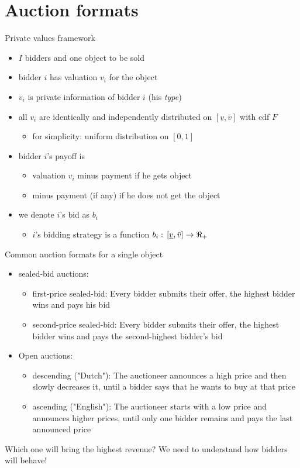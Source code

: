 \documentclass[bigger]{beamer}
\begin{document}
\section{Auction formats}
\label{sec:org2b4d17e}
\begin{frame}[label={sec:orge7ff8d6}]{Private values framework}
\begin{itemize}
\item \(I\) bidders and one object to be sold
\item bidder \(i\) has valuation \(v_i\) for the object
\item \(v_i\) is private information of bidder \(i\) (his \emph{type})
\item all \(v_i\) are identically and independently distributed on \([\underline v,\bar v]\) with cdf \(F\)
\begin{itemize}
\item for simplicity: uniform distribution on \([0,1]\)
\end{itemize}
\item bidder \(i\)'s payoff is
\begin{itemize}
\item valuation \(v_i\) minus payment if he gets object
\item minus payment (if any) if he does not get the object
\end{itemize}
\item we denote \(i\)'s bid as \(b_i\)
\begin{itemize}
\item \(i\)'s bidding strategy is a function \(b_i:\,[\underline v,\bar v]\rightarrow \Re_+\)
\end{itemize}
\end{itemize}
\end{frame}

\begin{frame}[label={sec:orgf1fe4b9}]{Common auction formats for a single object}
\begin{itemize}
\item sealed-bid auctions:
\begin{itemize}
\item first-price sealed-bid: Every bidder submits their offer, the highest bidder wins and pays his bid
\item second-price sealed-bid: Every bidder submits their offer, the highest bidder wins and pays the second-highest bidder’s bid
\end{itemize}
\item Open auctions:
\begin{itemize}
\item descending ("Dutch"): The auctioneer announces a high price and then slowly decreases it, until a bidder says that he wants to buy at that price
\item ascending ("English"): The auctioneer starts with a low price and announces higher prices, until only one bidder remains and pays the last announced price
\end{itemize}
\end{itemize}
Which one will bring the highest revenue? \linebreak We need to understand how bidders will behave!
\end{frame}
\end{document}
